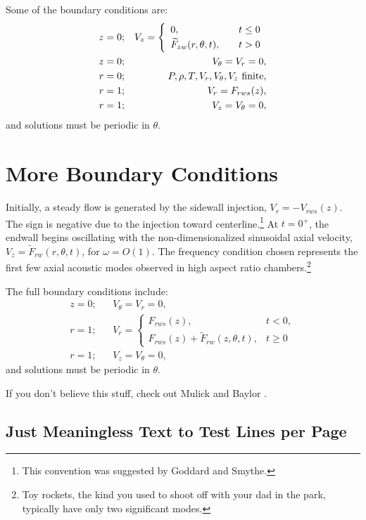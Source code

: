 Some of the boundary conditions are:
\begin{eqnarray}
  z=0; && V_z = \twochoices
	{0, && t\leq0}
	{\widetilde{F}_{zw}(r,\theta,t), && t>0}
						\label{eq:endwall} \\
  z=0; && V_{\theta}=V_r=0,			\label{eq:endnoslip} \\
  r=0; && P,\rho,T,V_r,V_{\theta},V_z~\mbox{finite},	\label{eq:centerline} \\
  r=1; && V_r= F_{rws}(z),			\label{eq:injection} \\
  r=1; && V_z=V_{\theta} =0,				\label{eq:sidenoslip}
\end{eqnarray}
and solutions must be periodic in $\theta$.


\section{More Boundary Conditions}
\label{sec:bcs}

Initially, a steady flow is generated by the
sidewall injection, $V_r = -V_{rws}(z)$.
The sign is negative due to the injection toward
centerline.\footnote{This convention was
suggested by Goddard and Smythe.}
At $t=0^+$, the endwall begins oscillating with the
non-dimensionalized sinusoidal axial velocity,
$V_z =\widetilde{F}_{rw}(r,\theta,t)$,
for $\omega = O(1)$.
The frequency condition chosen represents the
first few axial acoustic modes observed in high
aspect ratio chambers.\footnote{Toy rockets,
the kind you used to shoot off with your dad
in the park, typically have only two significant
modes.}

The full boundary conditions include:
\begin{eqnarray}
  z=0; && V_{\theta}=V_r = 0,            \label{eqB:endnoslip} \\
  r=1; && V_r= \left\{
    \begin{array}{ll}
      F_{rws}(z), & t<0, \\
      F_{rws}(z)+\widetilde{F}_{rw}(z,\theta,t), & t\geq 0
    \end{array}
  \right.                               \label{eqB:injection} \\
  r=1; && V_z=V_{\theta} =0,                  \label{eqB:sidenoslip}
\end{eqnarray}
and solutions must be periodic in $\theta$.

If you don't believe this stuff, check out
Mulick \cite{mulick} and Baylor \cite{baylor}.

\subsection{Just Meaningless Text to Test Lines per Page
	\label{ss}}

